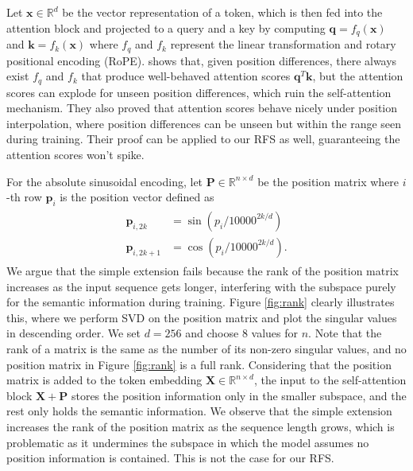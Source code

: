 \documentclass[11pt]{article}
\begin{document}
Let $\mathbf{x} \in \mathbb{R}^d$ be the vector representation of a token, which is then fed into the attention block and projected to a query and a key by computing $\mathbf{q} = f_q(\mathbf{x})$ and $\mathbf{k} = f_k(\mathbf{x})$ where $f_q$ and $f_k$ represent the linear transformation and rotary positional encoding (RoPE). \citet{chen2023extendingcontextwindowlarge} shows that, given position differences, there always exist $f_q$ and $f_k$ that produce well-behaved attention scores $\mathbf{q}^T \mathbf{k}$, but the attention scores can explode for unseen position differences, which ruin the self-attention mechanism. They also proved that attention scores behave nicely under position interpolation, where position differences can be unseen but within the range seen during training. Their proof can be applied to our RFS as well, guaranteeing the attention scores won't spike.

For the absolute sinusoidal encoding, let $\mathbf{P} \in \mathbb{R}^{n \times d}$ be the position matrix where $i$-th row $\mathbf{p}_i$ is the position vector defined as  
\begin{align}\label{eq:sinusoidal}
    \begin{split}
        \mathbf{p}_{i, 2k} &= \sin(p_i / 10000^{2k / d}) \\
        \mathbf{p}_{i, 2k+1} &= \cos(p_i / 10000^{2k / d}).
    \end{split}
\end{align}
We argue that the simple extension fails because the rank of the position matrix increases as the input sequence gets longer, interfering with the subspace purely for the semantic information during training. Figure \ref{fig:rank} clearly illustrates this, where we perform SVD on the position matrix and plot the singular values in descending order. We set $d=256$ and choose 8 values for $n$. Note that the rank of a matrix is the same as the number of its non-zero singular values, and no position matrix in Figure \ref{fig:rank} is a full rank. Considering that the position matrix is added to the token embedding $\mathbf{X} \in \mathbb{R}^{n \times d}$, the input to the self-attention block $\mathbf{X} + \mathbf{P}$ stores the position information only in the smaller subspace, and the rest only holds the semantic information. We observe that the simple extension increases the rank of the position matrix as the sequence length grows, which is problematic as it undermines the subspace in which the model assumes no position information is contained. This is not the case for our RFS.
\end{document}
